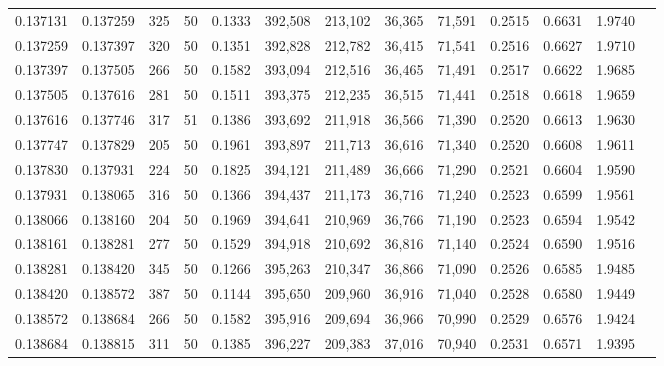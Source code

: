 \begin{tabular}{rrrrrrrrrrrrr}
0.137131 & 0.137259 &   325 &  50 &                                     0.1333 & 392,508 & 213,102 &  36,365 &  71,591 & 0.2515 & 0.6631 & 1.9740 \\
0.137259 & 0.137397 &   320 &  50 &                                     0.1351 & 392,828 & 212,782 &  36,415 &  71,541 & 0.2516 & 0.6627 & 1.9710 \\
0.137397 & 0.137505 &   266 &  50 &                                     0.1582 & 393,094 & 212,516 &  36,465 &  71,491 & 0.2517 & 0.6622 & 1.9685 \\
0.137505 & 0.137616 &   281 &  50 &                                     0.1511 & 393,375 & 212,235 &  36,515 &  71,441 & 0.2518 & 0.6618 & 1.9659 \\
0.137616 & 0.137746 &   317 &  51 &                                     0.1386 & 393,692 & 211,918 &  36,566 &  71,390 & 0.2520 & 0.6613 & 1.9630 \\
0.137747 & 0.137829 &   205 &  50 &                                     0.1961 & 393,897 & 211,713 &  36,616 &  71,340 & 0.2520 & 0.6608 & 1.9611 \\
0.137830 & 0.137931 &   224 &  50 &                                     0.1825 & 394,121 & 211,489 &  36,666 &  71,290 & 0.2521 & 0.6604 & 1.9590 \\
0.137931 & 0.138065 &   316 &  50 &                                     0.1366 & 394,437 & 211,173 &  36,716 &  71,240 & 0.2523 & 0.6599 & 1.9561 \\
0.138066 & 0.138160 &   204 &  50 &                                     0.1969 & 394,641 & 210,969 &  36,766 &  71,190 & 0.2523 & 0.6594 & 1.9542 \\
0.138161 & 0.138281 &   277 &  50 &                                     0.1529 & 394,918 & 210,692 &  36,816 &  71,140 & 0.2524 & 0.6590 & 1.9516 \\
0.138281 & 0.138420 &   345 &  50 &                                     0.1266 & 395,263 & 210,347 &  36,866 &  71,090 & 0.2526 & 0.6585 & 1.9485 \\
0.138420 & 0.138572 &   387 &  50 &                                     0.1144 & 395,650 & 209,960 &  36,916 &  71,040 & 0.2528 & 0.6580 & 1.9449 \\
0.138572 & 0.138684 &   266 &  50 &                                     0.1582 & 395,916 & 209,694 &  36,966 &  70,990 & 0.2529 & 0.6576 & 1.9424 \\
0.138684 & 0.138815 &   311 &  50 &                                     0.1385 & 396,227 & 209,383 &  37,016 &  70,940 & 0.2531 & 0.6571 & 1.9395 \\

\end{tabular}
